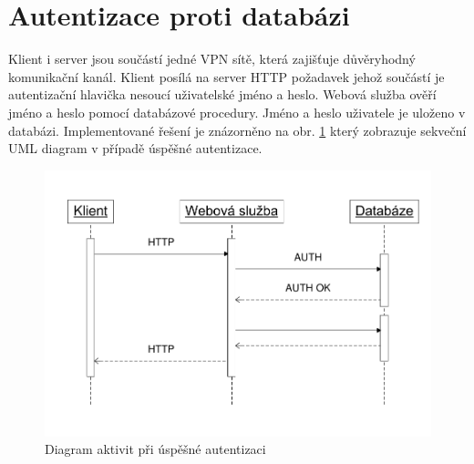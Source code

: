 \documentclass{diplomka}
\begin{document}
\section{Autentizace proti databázi}
Klient i server jsou součástí jedné VPN sítě, která zajišťuje důvěryhodný komunikační kanál.  Klient posílá na server HTTP požadavek jehož součástí je autentizační hlavička nesoucí uživatelské jméno a heslo. Webová služba ověří jméno a heslo pomocí databázové procedury. Jméno a heslo uživatele je uloženo v databázi. Implementované řešení je znázorněno na obr. \ref{fig:auth} který zobrazuje sekveční UML diagram v případě úspěšné autentizace.
\begin{figure}[H]
  \centering
  \includegraphics[scale=0.8]{visio/auth.pdf}
\caption{Diagram aktivit při úspěšné autentizaci}
\label{fig:auth}
\end{figure}
\end{document}
